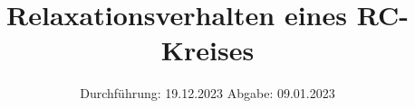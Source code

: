 

\subject{V353}
\title{Relaxationsverhalten eines RC-Kreises}
\date{%
  Durchführung: 19.12.2023
  \hspace{3em}
  Abgabe: 09.01.2023
}



\maketitle
\thispagestyle{empty}
\tableofcontents
\newpage






\printbibliography{}


